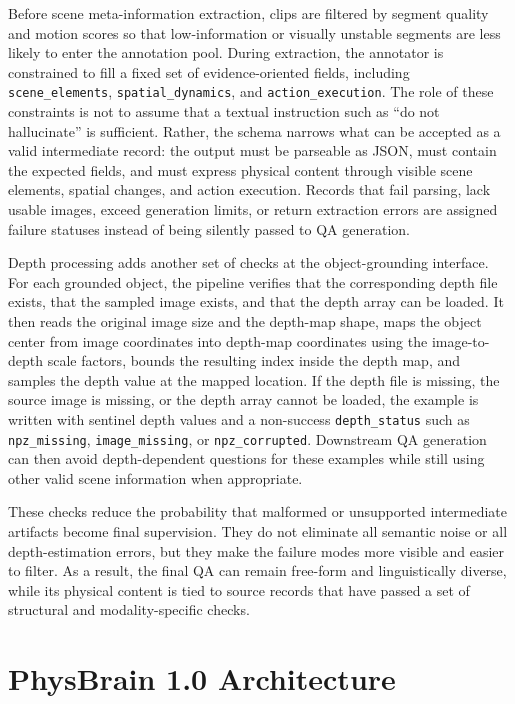 \documentclass{llmxive}
\begin{document}
Before scene meta-information extraction, clips are filtered by segment quality and motion scores so that low-information or visually unstable segments are less likely to enter the annotation pool. During extraction, the annotator is constrained to fill a fixed set of evidence-oriented fields, including \texttt{scene\_elements}, \texttt{spatial\_dynamics}, and \texttt{action\_execution}. The role of these constraints is not to assume that a textual instruction such as ``do not hallucinate'' is sufficient. Rather, the schema narrows what can be accepted as a valid intermediate record: the output must be parseable as JSON, must contain the expected fields, and must express physical content through visible scene elements, spatial changes, and action execution. Records that fail parsing, lack usable images, exceed generation limits, or return extraction errors are assigned failure statuses instead of being silently passed to QA generation.

Depth processing adds another set of checks at the object-grounding interface. For each grounded object, the pipeline verifies that the corresponding depth file exists, that the sampled image exists, and that the depth array can be loaded. It then reads the original image size and the depth-map shape, maps the object center from image coordinates into depth-map coordinates using the image-to-depth scale factors, bounds the resulting index inside the depth map, and samples the depth value at the mapped location. If the depth file is missing, the source image is missing, or the depth array cannot be loaded, the example is written with sentinel depth values and a non-success \texttt{depth\_status} such as \texttt{npz\_missing}, \texttt{image\_missing}, or \texttt{npz\_corrupted}. Downstream QA generation can then avoid depth-dependent questions for these examples while still using other valid scene information when appropriate.

These checks reduce the probability that malformed or unsupported intermediate artifacts become final supervision. They do not eliminate all semantic noise or all depth-estimation errors, but they make the failure modes more visible and easier to filter. As a result, the final QA can remain free-form and linguistically diverse, while its physical content is tied to source records that have passed a set of structural and modality-specific checks.

\section{PhysBrain 1.0 Architecture}
\label{sec:architecture}
\end{document}
